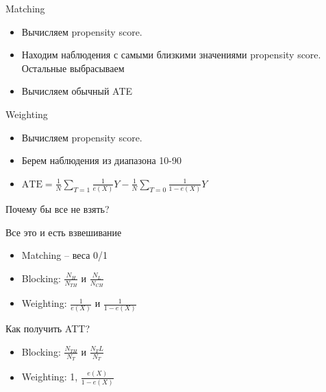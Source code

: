 \begin{frame}{Matching}
\begin{itemize}
    \item Вычисляем propensity score.
    \item Находим наблюдения с самыми близкими значениями propensity score. Остальные выбрасываем
    \item Вычисляем обычный ATE
\end{itemize}
\end{frame}

\begin{frame}{Weighting}
\begin{itemize}
    \item Вычисляем propensity score.
    \item Берем наблюдения из диапазона 10-90
    \item $\text{ATE} = \frac{1}{N}\sum_{T=1} \frac{1}{e(X)} Y - \frac{1}{N}\sum_{T=0} \frac{1}{1 - e(X)} Y$
\end{itemize}
    \item Почему бы все не взять?
\end{frame}


\begin{frame}{Все это и есть взвешивание}
\begin{itemize}
    \item Matching -- веса 0/1
    \item Blocking: $\frac{N_H}{N_{TH}}$ и $\frac{N_L}{N_{CH}}$
    \item Weighting: $\frac{1}{e(X)}$ и $\frac{1}{1 - e(X)}$
\end{itemize}


Как получить ATT?
\begin{itemize}
    \item Blocking: $\frac{N_{TH}}{N_{T}}$ и $\frac{N_TL}{N_{T}}$
    \item Weighting: 1, $\frac{e(X)}{1 - e(X)}$
\end{itemize}
\end{frame}







